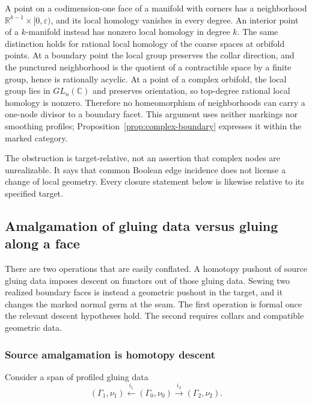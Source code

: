 \documentclass[11pt,letterpaper,twoside]{article}
\theoremstyle{plain}
\theoremstyle{definition}
\theoremstyle{remark}
\begin{document}
A point on a codimension-one face of a manifold with corners has a neighborhood \(\mathbb R^{k-1}\times[0,\varepsilon)\), and its local homology vanishes in every degree.  An interior point of a \(k\)-manifold instead has nonzero local homology in degree \(k\).  The same distinction holds for rational local homology of the coarse spaces at orbifold points.  At a boundary point the local group preserves the collar direction, and the punctured neighborhood is the quotient of a contractible space by a finite group, hence is rationally acyclic.  At a point of a complex orbifold, the local group lies in \(GL_n(\mathbb C)\) and preserves orientation, so top-degree rational local homology is nonzero.  Therefore no homeomorphism of neighborhoods can carry a one-node divisor to a boundary facet.  This argument uses neither markings nor smoothing profiles; Proposition~\ref{prop:complex-boundary} expresses it within the marked category.

The obstruction is target-relative, not an assertion that complex nodes are unrealizable.  It says that common Boolean edge incidence does not license a change of local geometry.  Every closure statement below is likewise relative to its specified target.

\subsection{Amalgamation of gluing data versus gluing along a face}

There are two operations that are easily conflated.  A homotopy pushout of source gluing data imposes descent on functors out of those gluing data.  Sewing two realized boundary faces is instead a geometric pushout in the target, and it changes the marked normal germ at the seam.  The first operation is formal once the relevant descent hypotheses hold.  The second requires collars and compatible geometric data.

\subsubsection{Source amalgamation is homotopy descent}

Consider a span of profiled gluing data
\begin{equation}\label{eq:profiled-amalgamation-span}
 (\Gamma_1,\nu_1)
 \xleftarrow{\ i_1\ }
 (\Gamma_0,\nu_0)
 \xrightarrow{\ i_2\ }
 (\Gamma_2,\nu_2).
\end{equation}
\end{document}
